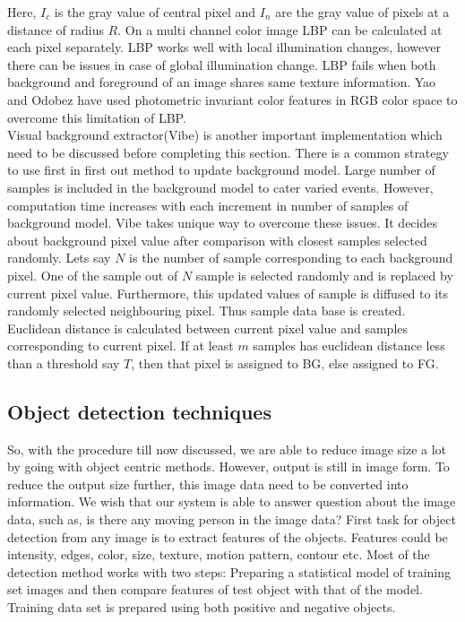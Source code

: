 \indent Here, $I_c$ is the gray value of central pixel and $I_n$ are the gray
value of pixels at a distance of radius $R$.  On a multi channel color
image LBP can be calculated at each pixel separately. LBP works well with
local illumination changes, however there can be issues in case of
global illumination change. LBP fails when both background and foreground
of an image shares same texture information. Yao and Odobez have used
photometric invariant color features in RGB color space to overcome this
limitation of LBP.\\

\indent Visual background extractor(Vibe) \cite{9} is another important
implementation which need to be discussed before completing this
section. There is a common strategy to use first in first out method to
update background model. Large number of samples is included in the
background model to cater varied events. However, computation time
increases with each increment in number of samples of background model.
Vibe takes unique way to overcome these issues. It decides about
background pixel value after comparison with closest samples selected
randomly. Lets say $N$ is the number of sample corresponding to each
background pixel. One of the sample out of $N$ sample is selected
randomly and is replaced by current pixel value. Furthermore, this
updated values of sample is diffused to its randomly selected
neighbouring pixel. Thus sample data base is created. Euclidean distance
is calculated between current pixel value and samples corresponding to
current pixel. If at least $m$ samples has euclidean distance less than
a threshold say $T$, then that pixel is assigned to BG, else assigned to
FG.\\

\subsection{Object detection techniques}
\indent So, with the procedure till now discussed, we are able to reduce
image size a lot by going with object centric methods. However, output
is still in image form. To reduce the output size further, this image
data need to be converted into information. We wish that our system is
able to answer question about the image data, such as, is there any
moving person in the image data? First task for object detection from
any image is to extract features of the objects. Features could be
intensity, edges, color, size, texture, motion pattern, contour etc.
Most of the detection method works with two steps: Preparing a
statistical model of training set images and then compare features of
test object with that of the model.  Training data set is prepared using
both positive and negative objects.\\

